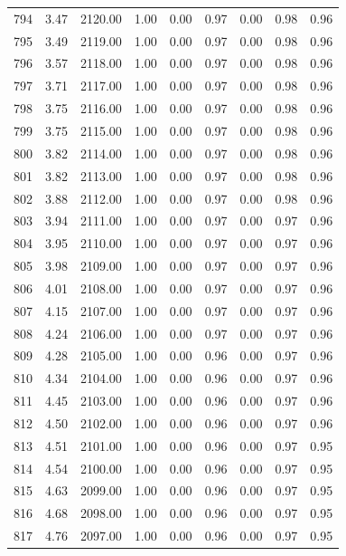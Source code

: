 \documentclass{article}\usepackage[]{graphicx}\usepackage[]{color}
\begin{document}
\begin{longtable}{rrrrrrrrr}
  794 & 3.47 & 2120.00 & 1.00 & 0.00 & 0.97 & 0.00 & 0.98 & 0.96 \\ 
  795 & 3.49 & 2119.00 & 1.00 & 0.00 & 0.97 & 0.00 & 0.98 & 0.96 \\ 
  796 & 3.57 & 2118.00 & 1.00 & 0.00 & 0.97 & 0.00 & 0.98 & 0.96 \\ 
  797 & 3.71 & 2117.00 & 1.00 & 0.00 & 0.97 & 0.00 & 0.98 & 0.96 \\ 
  798 & 3.75 & 2116.00 & 1.00 & 0.00 & 0.97 & 0.00 & 0.98 & 0.96 \\ 
  799 & 3.75 & 2115.00 & 1.00 & 0.00 & 0.97 & 0.00 & 0.98 & 0.96 \\ 
  800 & 3.82 & 2114.00 & 1.00 & 0.00 & 0.97 & 0.00 & 0.98 & 0.96 \\ 
  801 & 3.82 & 2113.00 & 1.00 & 0.00 & 0.97 & 0.00 & 0.98 & 0.96 \\ 
  802 & 3.88 & 2112.00 & 1.00 & 0.00 & 0.97 & 0.00 & 0.98 & 0.96 \\ 
  803 & 3.94 & 2111.00 & 1.00 & 0.00 & 0.97 & 0.00 & 0.97 & 0.96 \\ 
  804 & 3.95 & 2110.00 & 1.00 & 0.00 & 0.97 & 0.00 & 0.97 & 0.96 \\ 
  805 & 3.98 & 2109.00 & 1.00 & 0.00 & 0.97 & 0.00 & 0.97 & 0.96 \\ 
  806 & 4.01 & 2108.00 & 1.00 & 0.00 & 0.97 & 0.00 & 0.97 & 0.96 \\ 
  807 & 4.15 & 2107.00 & 1.00 & 0.00 & 0.97 & 0.00 & 0.97 & 0.96 \\ 
  808 & 4.24 & 2106.00 & 1.00 & 0.00 & 0.97 & 0.00 & 0.97 & 0.96 \\ 
  809 & 4.28 & 2105.00 & 1.00 & 0.00 & 0.96 & 0.00 & 0.97 & 0.96 \\ 
  810 & 4.34 & 2104.00 & 1.00 & 0.00 & 0.96 & 0.00 & 0.97 & 0.96 \\ 
  811 & 4.45 & 2103.00 & 1.00 & 0.00 & 0.96 & 0.00 & 0.97 & 0.96 \\ 
  812 & 4.50 & 2102.00 & 1.00 & 0.00 & 0.96 & 0.00 & 0.97 & 0.96 \\ 
  813 & 4.51 & 2101.00 & 1.00 & 0.00 & 0.96 & 0.00 & 0.97 & 0.95 \\ 
  814 & 4.54 & 2100.00 & 1.00 & 0.00 & 0.96 & 0.00 & 0.97 & 0.95 \\ 
  815 & 4.63 & 2099.00 & 1.00 & 0.00 & 0.96 & 0.00 & 0.97 & 0.95 \\ 
  816 & 4.68 & 2098.00 & 1.00 & 0.00 & 0.96 & 0.00 & 0.97 & 0.95 \\ 
  817 & 4.76 & 2097.00 & 1.00 & 0.00 & 0.96 & 0.00 & 0.97 & 0.95 \\ 

\end{longtable}
\end{document}

